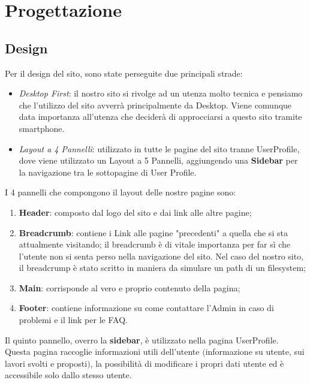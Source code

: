 \section{Progettazione}
	
  \subsection{Design}
  Per il design del sito, sono state perseguite due principali strade:
  \begin{itemize}
    \item \textit{Desktop First}: il nostro sito si rivolge ad un utenza molto tecnica e pensiamo che l'utilizzo del sito avverrà principalmente da Desktop. Viene comunque data importanza all'utenza che deciderà di approcciarsi a questo sito tramite smartphone.
    \item \textit{Layout a 4 Pannelli}: utilizzato in tutte le pagine del sito tranne UserProfile, dove viene utilizzato un Layout a 5 Pannelli, aggiungendo una \textbf{Sidebar} per la navigazione tra le sottopagine di User Profile.
  \end{itemize}

  I 4 pannelli che compongono il layout delle nostre pagine sono:
  \begin{enumerate}
    \item \textbf{Header}: composto dal logo del sito e dai link alle altre pagine;
    \item \textbf{Breadcrumb}: contiene i Link alle pagine "precedenti" a quella che si sta attualmente visitando; il breadcrumb è di vitale importanza per far sì che l'utente
      non si senta perso nella navigazione del sito. Nel caso del nostro sito, il breadcrump è stato scritto in maniera da simulare un path di un filesystem;
    \item \textbf{Main}: corrisponde al vero e proprio contenuto della pagina;
    \item \textbf{Footer}: contiene informazione su come contattare l'Admin in caso di problemi e il link per le FAQ.
  \end{enumerate}
  
  Il quinto pannello, overro la \textbf{sidebar}, è utilizzato nella pagina UserProfile. 
  Questa pagina raccoglie informazioni utili dell'utente $($informazione su utente, sui lavori svolti e proposti$)$, la possibilità di modificare i propri dati utente ed è accessibile solo dallo stesso utente.


